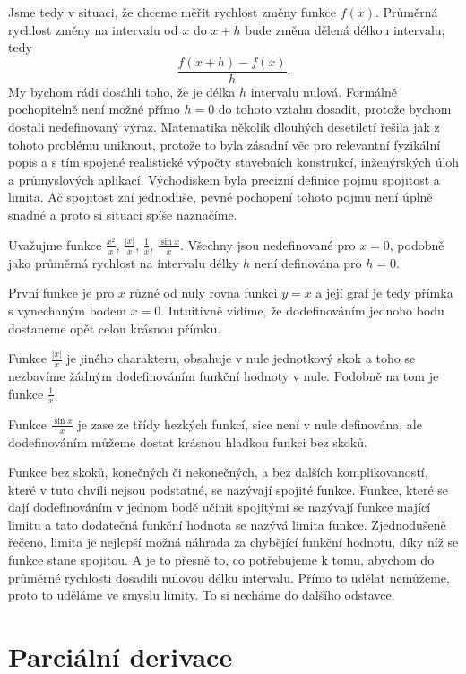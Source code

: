 \documentclass[12pt]{article}
\begin{document}
Jsme tedy v situaci, že chceme měřit rychlost změny funkce $f(x)$. Průměrná rychlost změny na intervalu od $x$ do $x+h$ bude změna dělená délkou intervalu, tedy $$\frac{f(x+h)-f(x)}{h}.$$ My bychom rádi dosáhli toho, že je délka $h$ intervalu nulová. Formálně pochopitelně není možné přímo $h=0$ do tohoto vztahu dosadit, protože bychom dostali nedefinovaný výraz. Matematika několik dlouhých desetiletí řešila jak z tohoto problému uniknout, protože to byla zásadní věc pro relevantní fyzikální popis a s tím spojené realistické výpočty stavebních konstrukcí, inženýrských úloh a průmyslových aplikací. Východiskem byla precizní definice pojmu spojitost a limita. Ač spojitost zní jednoduše, pevné pochopení tohoto pojmu není úplně snadné a proto si situaci spíše naznačíme.

Uvažujme funkce $\frac{x^2}{x}$, $\frac{|x|}{x}$, $\frac 1{x}$, $\frac {\sin x}{x}$. Všechny jsou nedefinované pro $x=0$, podobně jako průměrná rychlost na intervalu délky $h$ není definována pro $h=0$.

První funkce je pro $x$ různé od nuly rovna funkci $y=x$ a její graf je tedy přímka s vynechaným bodem $x=0$. Intuitivně vidíme, že dodefinováním jednoho bodu dostaneme opět celou krásnou přímku.

Funkce $\frac{|x|}{x}$ je jiného charakteru, obsahuje v nule jednotkový skok a toho se nezbavíme žádným dodefinováním funkční hodnoty v nule. Podobně na tom je funkce $\frac 1x$.

Funkce $\frac{\sin x}{x}$ je zase ze třídy hezkých funkcí, sice není v nule definována, ale dodefinováním můžeme dostat krásnou hladkou funkci bez skoků.

Funkce bez skoků, konečných či nekonečných, a bez dalších komplikovaností, které v tuto chvíli nejsou podstatné, se nazývají spojité funkce. Funkce, které se dají dodefinováním v jednom bodě učinit spojitými se nazývají funkce mající limitu a tato dodatečná funkční hodnota se nazývá limita funkce. Zjednodušeně řečeno, limita je nejlepší možná náhrada za chybějící funkční hodnotu, díky níž se funkce stane spojitou. A je to přesně to, co potřebujeme k tomu, abychom do průměrné rychlosti dosadili nulovou délku intervalu. Přímo to udělat nemůžeme, proto to uděláme ve smyslu limity. To si necháme do dalšího odstavce.


\newpage
\section*{Parciální derivace}
\end{document}
